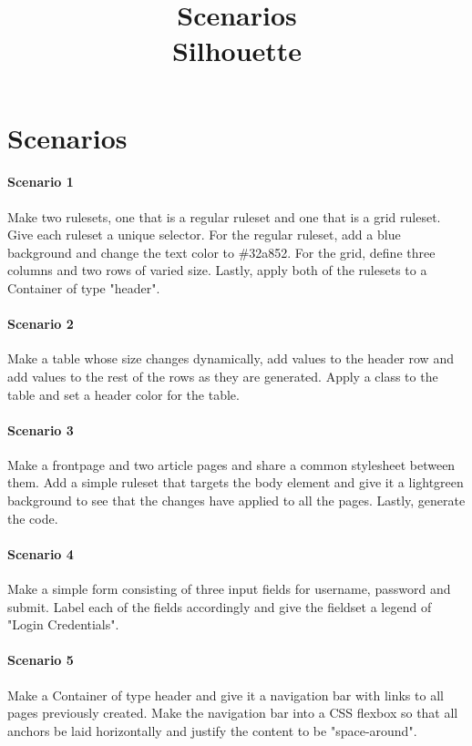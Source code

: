 \documentclass[12pt]{article}
\begin{document}
\title{%
    Scenarios\\
    \large Silhouette}
\date{}
\maketitle

\section{Scenarios}

\paragraph{Scenario 1}
Make two rulesets, one that is a regular ruleset and one that is a grid ruleset. Give each ruleset a unique selector. For the regular ruleset, add a blue background and change the text color to \#32a852. For the grid, define three columns and two rows of varied size. Lastly, apply both of the rulesets to a Container of type "header".

\paragraph{Scenario 2}
Make a table whose size changes dynamically, add values to the header row and add values to the rest of the rows as they are generated. Apply a class to the table and set a header color for the table.

\paragraph{Scenario 3}
Make a frontpage and two article pages and share a common stylesheet between them. Add a simple ruleset that targets the body element and give it a lightgreen background to see that the changes have applied to all the pages. Lastly, generate the code.

\paragraph{Scenario 4}
Make a simple form consisting of three input fields for username, password and submit. Label each of the fields accordingly and give the fieldset a legend of "Login Credentials".

\paragraph{Scenario 5}
Make a Container of type header and give it a navigation bar with links to all pages previously created. Make the navigation bar into a CSS flexbox so that all anchors be laid horizontally and justify the content to be "space-around".
\end{document}

